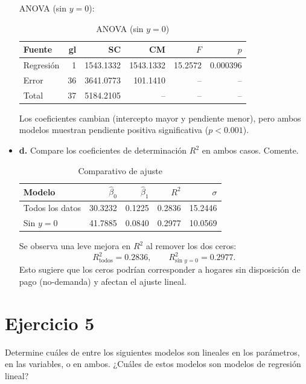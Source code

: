 \documentclass[10pt]{article}
\begin{document}
\begin{itemize}
    \noindent ANOVA (sin $y=0$):
    \begin{table}[H]
      \centering
      {\color{blue}
      \caption{ANOVA (sin $y=0$)}
      \label{tab:cable_anova_nz}
      \begin{tabular}{|l|r|r|r|r|r|}
        \hline
        \textbf{Fuente} & \textbf{gl} & \textbf{SC} & \textbf{CM} & \textbf{$F$} & \textbf{$p$} \\
        \hline
        Regresión & 1  & 1543.1332 & 1543.1332 & 15.2572 & 0.000396 \\
        Error     & 36 & 3641.0773 &  101.1410 &   --     &   --     \\
        Total     & 37 & 5184.2105 &      --    &   --     &   --     \\
        \hline
      \end{tabular}}
    \end{table}
    Los coeficientes cambian (intercepto mayor y pendiente menor), pero ambos modelos muestran pendiente positiva significativa ($p<0.001$).
    \endgroup
    \item \textbf{d.} Compare los coeficientes de determinación $R^2$ en ambos casos. Comente.\\
    \begingroup\color{blue}
    \begin{table}[H]
      \centering
      {\color{blue}
      \caption{Comparativo de ajuste}
      \label{tab:cable_comp}
      \begin{tabular}{|l|r|r|r|r|}
        \hline
        \textbf{Modelo} & $\hat\beta_0$ & $\hat\beta_1$ & $R^2$ & $\sigma$ \\
        \hline
        Todos los datos   & 30.3232 & 0.1225 & 0.2836 & 15.2446 \\
        Sin $y=0$        & 41.7885 & 0.0840 & 0.2977 & 10.0569 \\
        \hline
      \end{tabular}}
    \end{table}
    Se observa una leve mejora en \(R^2\) al remover los dos ceros: 
    \[ R^2_{\text{todos}}=0.2836, \qquad R^2_{\text{sin }y=0}=0.2977. \]
    Esto sugiere que los ceros podrían corresponder a hogares sin disposición de pago (no-demanda) y afectan el ajuste lineal.
    \endgroup
\end{itemize}

\section{Ejercicio 5}
Determine cuáles de entre los siguientes modelos son lineales en los parámetros, en las variables, o en ambos. ¿Cuáles de estos modelos son modelos de regresión lineal?
\end{document}
